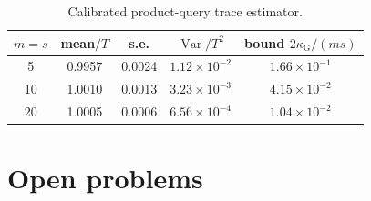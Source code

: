 \documentclass[11pt,a4paper]{article}
\theoremstyle{definition}
\theoremstyle{remark}
\numberwithin{equation}{section}
\newcommand{\Var}{\operatorname{Var}}
\newcommand{\kapG}{\kappa_{\mathrm G}}
\begin{document}
\begin{table}[htbp]
\centering\small
\begin{tabular}{@{}ccccc@{}}\toprule
$m=s$ & mean$/T$ & s.e. & $\Var/T^2$ & bound $2\kapG/(ms)$\\\midrule
5  & 0.9957 & 0.0024 & $1.12\times10^{-2}$ & $1.66\times10^{-1}$\\
10 & 1.0010 & 0.0013 & $3.23\times10^{-3}$ & $4.15\times10^{-2}$\\
20 & 1.0005 & 0.0006 & $6.56\times10^{-4}$ & $1.04\times10^{-2}$\\\bottomrule
\end{tabular}
\caption{Calibrated product-query trace estimator.}
\label{tab:trace}
\end{table}

\section{Open problems}\label{sec:open}
\end{document}
